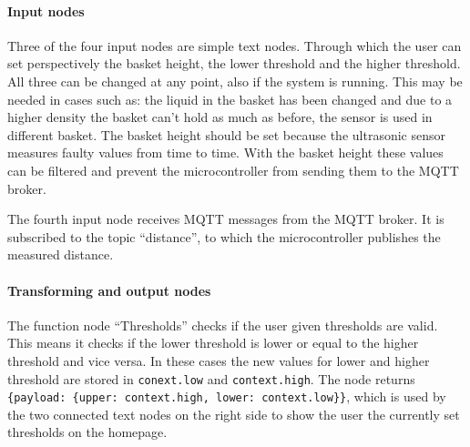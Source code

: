 \documentclass{article}
\begin{document}
\paragraph{Input nodes}\mbox{}

Three of the four input nodes are simple text nodes. Through which the user can set perspectively
the basket height, the lower threshold and the higher threshold. All three can be changed at any point, also if the system is running. This may be needed in cases such as: the liquid in the basket has been changed and due to a higher density the basket can't hold as much as before, the sensor is used in different basket. The basket height should be set because the ultrasonic sensor measures
faulty values from time to time. With the basket height these values can be filtered and prevent the
microcontroller from sending them to the MQTT broker.

The fourth input node receives MQTT messages from the MQTT broker. It is subscribed to the topic \enquote{distance}, to which the microcontroller publishes the measured distance.

\paragraph{Transforming and output nodes}\mbox{}
\label{sec:json}
The function node \enquote{Thresholds} checks if the user given
thresholds are valid. This means it checks if the lower threshold is lower or
equal to the higher threshold and vice versa. In these cases the
new values for lower and higher threshold are stored in \verb|conext.low| and
\verb|context.high|. The node returns 
\verb|{payload: {upper: context.high, lower: context.low}}|, which is used by the
two connected text nodes on the right side to show the user the currently set thresholds on the homepage.
\end{document}
